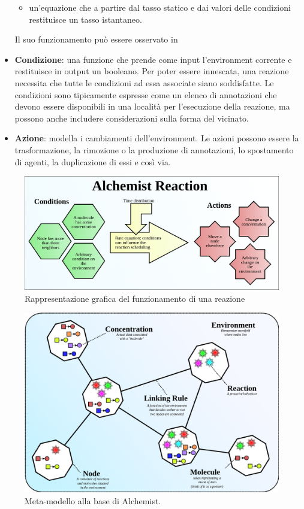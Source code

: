 \documentclass[12pt,a4paper,openright,twoside]{book}
\begin{document}
\begin{itemize}
\begin{itemize}
        \item un'equazione che a partire dal tasso statico e dai valori delle condizioni restituisce un tasso istantaneo.
    \end{itemize}
    Il suo funzionamento può essere osservato in~
    \item \textbf{Condizione}: una funzione che prende come input l'environment corrente e restituisce in output un booleano. Per poter essere innescata, una reazione necessita che tutte le condizioni ad essa associate siano soddisfatte. Le condizioni sono tipicamente espresse come un elenco di annotazioni che devono essere disponibili in una località per l'esecuzione della reazione, ma possono anche includere considerazioni sulla forma del vicinato.
    \item \textbf{Azione}: modella i cambiamenti dell'environment. Le azioni possono essere la trasformazione, la rimozione o la produzione di annotazioni, lo spostamento di agenti, la duplicazione di essi e così via.
\end{itemize}

\begin{figure}
    \centering
    \includegraphics[width=.85\linewidth]{figures/discrete-event-simulation/alchemist-reaction.png}
    \caption{Rappresentazione grafica del funzionamento di una reazione}
    \label{fig:alchemist-reaction}
\end{figure}

\begin{figure}
    \centering
    \includegraphics[width=.85\linewidth]{figures/discrete-event-simulation/alchemist-model.png}
    \caption{Meta-modello alla base di Alchemist.}
    \label{fig:alchemist-model}
\end{figure}
\end{document}
